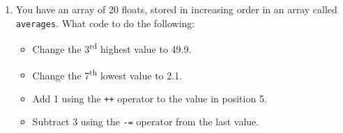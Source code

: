 \documentclass[letter,11pt]{article}
\begin{document}
\begin{enumerate}
\begin{verbatim}
int multiplyTwoNumbers(int,int);

int main() {
    int num1 = 100, num2 = 20, num3;
    num3 = multiplyTwoNumbers(num1, num2);
    printf("Multiplying num1 * num2 = %d\n", num3);
    return 0;
}

int multiplyTwoNumbers(int num2, int num1) {
    return num1 * num2;
}
    \end{verbatim}
    \begin{itemize}
        \item What is the value of \texttt{num2} in \texttt{multiplyTwoNumbers()}?
        \item What is the value of \texttt{num1} in \texttt{multiplyTwoNumbers()}?
        \item What is the value of \texttt{num2} after the \texttt{printf()} statement in \texttt{main()}?
        \item What is the value of \texttt{num1} after the \texttt{printf()} statement in \texttt{main()}?
        \item What is the value of \texttt{num3} after the \texttt{printf()} statement in \texttt{main()}?
    \end{itemize}
    
    \item You have an array of 20 floats, stored in increasing order in an array called \texttt{averages}. What code to do the following:
    \begin{itemize}
        \item Change the 3\textsuperscript{rd} highest value to 49.9.
        \item Change the 7\textsuperscript{th} lowest value to 2.1.
        \item Add 1 using the \texttt{++} operator to the value in position 5.
        \item Subtract 3 using the \texttt{-=} operator from the last value.
    \end{itemize}
\end{enumerate}
\end{document}
